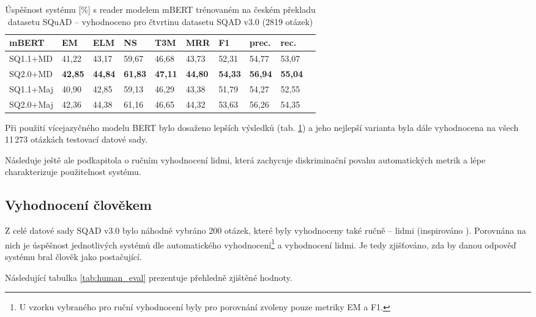 \begin{table}[H]
    \centering
    \begin{tabular}{|l||l|l|l|l|l|l|l|l|l|}
        \hline
        \textbf{mBERT}  & \textbf{EM}   & ELM       & NS        & T3M       & MRR       & \textbf{F1}   & prec.         & rec.      \\ \hline\hline
            SQ1.1+MD    & 41,22         & 43,17     & 59,67     & 46,68     & 43,73     & 52,31         & 54,77         & 53,07     \\ \hline
            SQ2.0+MD    & \textbf{42,85}&\textbf{44,84}&\textbf{61,83}&\textbf{47,11}&\textbf{44,80}&\textbf{54,33}&\textbf{56,94}&\textbf{55,04}\\ \hline
            SQ1.1+Maj   & 40,90         & 42,85     & 59,13     & 46,29     & 43,38     & 51,79         & 54,27         & 52,55         \\ \hline
            SQ2.0+Maj   & 42,36         & 44,38     & 61,16     & 46,65     & 44,32     & 53,63         & 56,26         & 54,35     \\ \hline
    \end{tabular}
    \caption{Úspěšnost systému [\%] s reader modelem mBERT trénovaném na českém překladu datasetu SQuAD -- vyhodnoceno pro čtvrtinu datasetu SQAD v3.0 (2819 otázek)}
    \label{tab:system_eval_mbert}
\end{table}

Při použití vícejazyčného modelu BERT bylo dosaženo lepších výsledků (tab. \ref{tab:system_eval_mbert}) a jeho nejlepší varianta byla dále vyhodnocena na všech 11\,273 otázkách testovací datové sady.\par
Následuje ještě ale podkapitola o ručním vyhodnocení lidmi, která zachycuje diskriminační povahu automatických metrik a lépe charakterizuje použitelnost systému.\pagebreak

\subsection{Vyhodnocení člověkem}
\label{human_eval}
Z celé datové sady SQAD v3.0 bylo náhodně vybráno 200 otázek, které byly vyhodnoceny také ručně -- lidmi (inspirováno \cite{min2021neurips}). Porovnána na nich je úspěšnost jednotlivých systémů dle automatického vyhodnocení\footnote{U vzorku vybraného pro ruční vyhodnocení byly pro porovnání zvoleny pouze metriky EM a F1.} a vyhodnocení lidmi. Je tedy zjišťováno, zda by danou odpověď systému bral člověk jako postačující.\par
Následující tabulka \ref{tab:human_eval} prezentuje přehledně zjištěné hodnoty.

